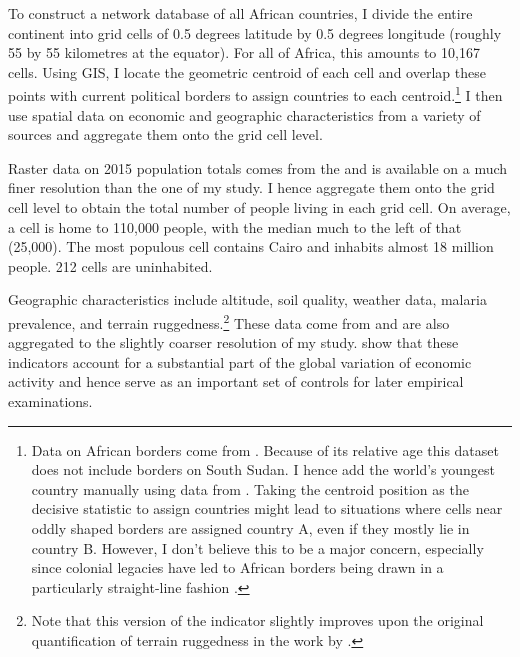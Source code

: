 \documentclass[11pt, oneside]{article}   	%
\begin{document}
To construct a network database of all African countries, I divide the entire continent into grid cells of 0.5 degrees latitude by 0.5 degrees longitude (roughly 55 by 55 kilometres at the equator). For all of Africa, this amounts to 10,167 cells. Using GIS, I locate the geometric centroid of each cell and overlap these points with current political borders to assign countries to each centroid.\footnote{Data on African borders come from \cite{Sandvik_WorldBordersDataset_2008}. Because of its relative age this dataset does not include borders on South Sudan. I hence add the world's youngest country manually using data from \cite{OCHA_SouthSudanAdministrative_2017}. Taking the centroid position as the decisive statistic to assign countries might lead to situations where cells near oddly shaped borders are assigned country A, even if they mostly lie in country B. However, I don't believe this to be a major concern, especially since colonial legacies have led to African borders being drawn in a particularly straight-line fashion \citep[see][]{Alesina_ArtificialStates_2011}.} I then use spatial data on economic and geographic characteristics from a variety of sources and aggregate them onto the grid cell level.

Raster data on 2015 population totals comes from the \cite{socioeconomic_data_and_applications_center_gridded_2016} and is available on a much finer resolution than the one of my study. I hence aggregate them onto the grid cell level to obtain the total number of people living in each grid cell. On average, a cell is home to 110,000 people, with the median much to the left of that (25,000). The most populous cell contains Cairo and inhabits almost 18 million people. 212 cells are uninhabited.

Geographic characteristics include altitude, soil quality, weather data, malaria prevalence, and terrain ruggedness.\footnote{Note that this version of the indicator slightly improves upon the original quantification of terrain ruggedness in the work by \cite{nunn_ruggedness:_2012}. } These data come from \cite{henderson_global_2018} and are also aggregated to the slightly coarser resolution of my study. \citeauthor{henderson_global_2018} show that these indicators account for a substantial part of the global variation of economic activity and hence serve as an important set of controls for later empirical examinations.
\end{document}
